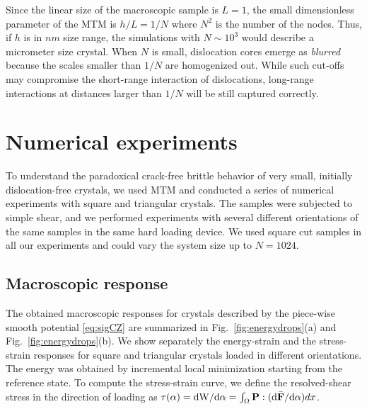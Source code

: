 \documentclass[CRPHYS,Unicode,manuscript]{cedram}
\begin{document}
Since  the linear size of the macroscopic sample is $L=1$, the small dimensionless parameter of the MTM is $h/L=1/N$ where $N^2$ is the number of the nodes. Thus, if $h$ is  in $nm$ size range, the simulations with $N \sim 10^3$ would describe a micrometer size crystal. 
When $N$ is small, dislocation cores emerge as \emph{blurred} because the scales smaller than $1/N$ are homogenized out. While such cut-offs may compromise the short-range interaction of dislocations, long-range interactions at distances larger than $1/N$ will be still captured correctly.
 
\section{Numerical experiments}

To understand the paradoxical crack-free brittle behavior of very small, initially dislocation-free crystals, we used MTM and conducted a series of numerical experiments with square and triangular crystals. The samples were subjected to simple shear, and we performed experiments with several different orientations of the same  samples in the same hard loading device. We used square cut samples in all our experiments and could vary the system size up to $N=1024$.  

\subsection{Macroscopic response}

The obtained  macroscopic responses for  crystals  described by the piece-wise smooth   potential \eqref{eq:sigCZ} are summarized in Fig.~\ref{fig:energydrops}(a) and Fig.~\ref{fig:energydrops}(b). We show separately  the energy-strain and the stress-strain   responses  for  square and triangular crystals loaded in  different orientations. The energy was obtained by incremental local minimization starting from the reference state. To compute the stress-strain curve,  we define the resolved-shear stress in the direction of loading as $\tau(\alpha)=\text{d}\mathrm{W}/\text{d}\alpha=\int_{\Omega}{\bf P}:(\text{d}\bar {\bf F}/\text{d}\alpha)dx$.
\end{document}
